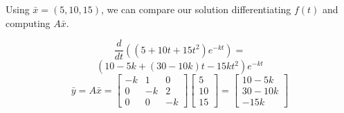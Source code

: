 \documentclass[12pt]{article}
\begin{document}
\newpage

Using $\bar{x} = (5, 10, 15)$, we can compare our solution differentiating $f(t)$ and computing $A\bar{x}$.

\[
  \frac{d}{dt}((5+10t+15t^2)e^{-kt}) = 
\]
\[
  (10-5k + (30-10k)t -15kt^2)e^{-kt}
\]
\medbreak{}
\[
  \bar{y} = A\bar{x} = 
  \begin{bmatrix}
    -k & 1 & 0 \\
    0 & -k & 2 \\
    0 & 0 & -k
  \end{bmatrix}
  \begin{bmatrix} 5 \\ 10 \\ 15 \end{bmatrix} = 
  \begin{bmatrix} 10-5k \\ 30-10k \\ -15k \end{bmatrix}
\]
\end{document}
